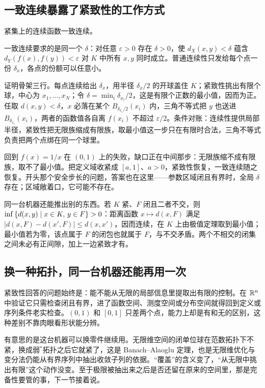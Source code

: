 \subsection{一致连续暴露了紧致性的工作方式}

\begin{theorem}
紧集上的连续函数一致连续。
\end{theorem}

一致连续要求的是同一个 \(\delta\)：对任意 \(\varepsilon>0\) 存在 \(\delta>0\)，使 \(d_X(x,y)<\delta\) 蕴含 \(d_Y(f(x),f(y))<\varepsilon\) 对 \(K\) 中所有 \(x,y\) 同时成立。普通连续性只发给每个点一份 \(\delta_x\)，各点的份额可以任意小。

证明骨架三行。每点连续给出 \(\delta_x\)，用半径 \(\delta_x/2\) 的开球盖住 \(K\)；紧致性挑出有限个球，中心为 \(x_1,\dots,x_N\)；令 \(\delta=\min_i\delta_{x_i}/2\)，这是有限个正数的最小值，因而为正。任取 \(d(x,y)<\delta\)，\(x\) 必落在某个 \(B_{\delta_{x_i}/2}(x_i)\) 内，三角不等式把 \(y\) 也送进 \(B_{\delta_{x_i}}(x_i)\)，两者的函数值各自离 \(f(x_i)\) 不超过 \(\varepsilon/2\)。条件对账：连续性提供局部半径，紧致性把无限族缩成有限族，取最小值这一步只在有限时合法，三角不等式负责把两个点绑在同一个球里。

回到 \(f(x)=1/x\) 在 \((0,1)\) 上的失败，缺口正在中间那步：无限族缩不成有限族，取不了最小值。把定义域收紧成 \([a,1]\)、\(a>0\)，紧致性恢复，一致连续随之恢复。开头那个安全步长的问题，答案也在这里——参数区域闭且有界时，全局 \(\delta\) 存在；区域敞着口，它可能不存在。

同一台机器还能推出别的东西。若 \(K\) 紧、\(F\) 闭且二者不交，则 \(\inf\left\{d(x,y)\mid x\in K,\,y\in F\right\}>0\)：距离函数 \(x\mapsto d(x,F)\) 满足 \(|d(x,F)-d(x',F)|\le d(x,x')\)，因而连续，在 \(K\) 上由极值定理取到最小值；最小值若为零，该点属于 \(F\) 的闭包也就属于 \(F\)，与不交矛盾。两个不相交的闭集之间未必有正间隙，加上一边紧致才有。

\subsection{换一种拓扑，同一台机器还能再用一次}

紧致性回答的问题始终是：能不能从无限的局部信息里提取出有限的控制。在 \(\mathbb{R}^n\) 中验证它只需检查闭且有界，进了函数空间、测度空间或分布空间就得回到定义或序列条件老实检查。\((0,1)\) 和 \([0,1]\) 只差两个点，能力上却是有和无的区别，这种差别不靠肉眼看形状能分辨。

有意思的是这台机器可以换零件继续用。无限维空间的闭单位球在范数拓扑下不紧，换成弱\(^{*}\)拓扑之后它就紧了，这是 Banach--Alaoglu 定理，也是无限维优化与变分法仍能从有界序列中抽出收敛子列的依据。``覆盖''的含义变了，``从无限中挑出有限''这个动作没变。至于极限被抽出来之后是否还留在原来的空间里，那是完备性要管的事，下一节接着说。
